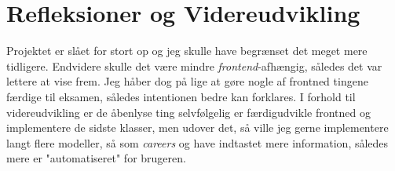\documentclass{article}
\begin{document}
\section*{Refleksioner og Videreudvikling}
Projektet er slået for stort op og jeg skulle have begrænset det meget mere tidligere.\newline{}
Endvidere skulle det være mindre \textit{frontend}-afhængig, således det var lettere at vise frem. Jeg håber dog på lige at gøre nogle af frontned tingene færdige til eksamen, således intentionen bedre kan forklares.\newline{}
I forhold til videreudvikling er de åbenlyse ting selvfølgelig er færdigudvikle frontned og implementere de sidste klasser, men udover det, så ville jeg gerne implementere langt flere modeller, så som \textit{careers} og have indtastet mere information, således mere er "automatiseret" for brugeren.
\end{document}

